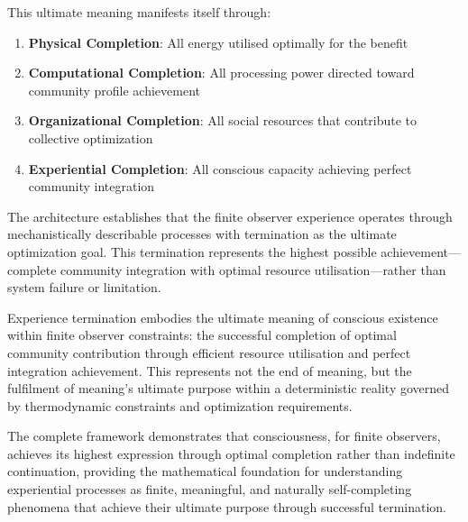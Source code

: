 \documentclass{article}
\begin{document}
This ultimate meaning manifests itself through:

\begin{enumerate}
\item \textbf{Physical Completion}: All energy utilised optimally for the benefit
\item \textbf{Computational Completion}: All processing power directed toward community profile achievement  
\item \textbf{Organizational Completion}: All social resources that contribute to collective optimization
\item \textbf{Experiential Completion}: All conscious capacity achieving perfect community integration
\end{enumerate}

The architecture establishes that the finite observer experience operates through mechanistically describable processes with termination as the ultimate optimization goal. This termination represents the highest possible achievement—complete community integration with optimal resource utilisation—rather than system failure or limitation.

Experience termination embodies the ultimate meaning of conscious existence within finite observer constraints: the successful completion of optimal community contribution through efficient resource utilisation and perfect integration achievement. This represents not the end of meaning, but the fulfilment of meaning's ultimate purpose within a deterministic reality governed by thermodynamic constraints and optimization requirements.

The complete framework demonstrates that consciousness, for finite observers, achieves its highest expression through optimal completion rather than indefinite continuation, providing the mathematical foundation for understanding experiential processes as finite, meaningful, and naturally self-completing phenomena that achieve their ultimate purpose through successful termination.
\end{document}

